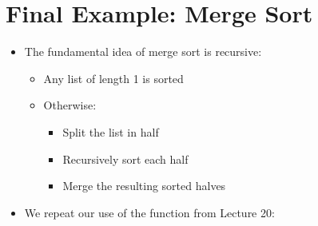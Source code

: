 \documentclass[letterpaper,10pt,english]{sphinxmanual}
\begin{document}
\section{Final Example: Merge Sort}
\label{\detokenize{lecture_notes/lec23_recursion:final-example-merge-sort}}\begin{itemize}
\item {} 
The fundamental idea of merge sort is recursive:
\begin{itemize}
\item {} 
Any list of length 1 is sorted

\item {} 
Otherwise:
\begin{itemize}
\item {} 
Split the list in half

\item {} 
Recursively sort each half

\item {} 
Merge the resulting sorted halves

\end{itemize}

\end{itemize}

\item {} 
We repeat our use of the  function from Lecture 20:

%
\begin{sphinxVerbatim}[commandchars=\\\{\}]
 
      
      
      \PYG{p}{[}\PYG{p}{]}
       
         \PYG{p}{[}\PYG{p}{]}  \PYG{p}{[}\PYG{p}{]}
            \PYG{p}{[}\PYG{p}{]}
              
            \PYG{p}{[}\PYG{p}{]}
              
    \PYG{p}{[}\PYG{p}{]}
    \PYG{p}{[}\PYG{p}{]}
     
\end{sphinxVerbatim}


\end{itemize}
\end{document}
